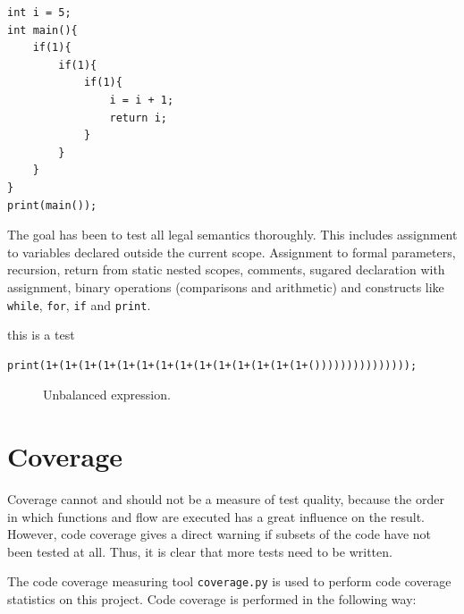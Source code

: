 \begin{verbatim}
int i = 5;
int main(){
    if(1){
        if(1){
            if(1){
                i = i + 1;
                return i;
            }
        }
    }
}
print(main());
\end{verbatim}

The goal has been to test all legal semantics thoroughly. This includes assignment to variables declared outside the current scope. Assignment to formal parameters, recursion, return from static nested scopes, comments, sugared declaration with assignment, binary operations (comparisons and arithmetic) and constructs like \texttt{while}, \texttt{for}, \texttt{if} and \texttt{print}.

\newpage

this is a test

\begin{verbatim}
print(1+(1+(1+(1+(1+(1+(1+(1+(1+(1+(1+(1+(1+(1+()))))))))))))));
\end{verbatim}

\begin{figure}[H]
    \centering
    
    \caption{Unbalanced expression.} 
\end{figure}

\newpage

\section{Coverage}
Coverage cannot and should not be a measure of test quality, because the order in which functions and flow are executed has a great influence on the result. However, code coverage gives a direct warning if subsets of the code have not been tested at all. Thus, it is clear that more tests need to be written.

The code coverage measuring tool \texttt{coverage.py} is used to perform code coverage statistics on this project. Code coverage is performed in the following way:

